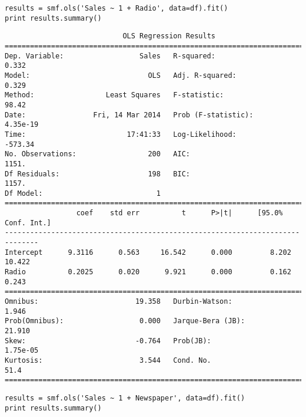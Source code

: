 \documentclass[12pt,fleqn]{article}\usepackage{../common}
\begin{document}
\begin{verbatim}
results = smf.ols('Sales ~ 1 + Radio', data=df).fit()
print results.summary()
\end{verbatim}

\begin{verbatim}
                            OLS Regression Results                            
==============================================================================
Dep. Variable:                  Sales   R-squared:                       0.332
Model:                            OLS   Adj. R-squared:                  0.329
Method:                 Least Squares   F-statistic:                     98.42
Date:                Fri, 14 Mar 2014   Prob (F-statistic):           4.35e-19
Time:                        17:41:33   Log-Likelihood:                -573.34
No. Observations:                 200   AIC:                             1151.
Df Residuals:                     198   BIC:                             1157.
Df Model:                           1                                         
==============================================================================
                 coef    std err          t      P>|t|      [95.0% Conf. Int.]
------------------------------------------------------------------------------
Intercept      9.3116      0.563     16.542      0.000         8.202    10.422
Radio          0.2025      0.020      9.921      0.000         0.162     0.243
==============================================================================
Omnibus:                       19.358   Durbin-Watson:                   1.946
Prob(Omnibus):                  0.000   Jarque-Bera (JB):               21.910
Skew:                          -0.764   Prob(JB):                     1.75e-05
Kurtosis:                       3.544   Cond. No.                         51.4
==============================================================================
\end{verbatim}

\begin{verbatim}
results = smf.ols('Sales ~ 1 + Newspaper', data=df).fit()
print results.summary()
\end{verbatim}
\end{document}

